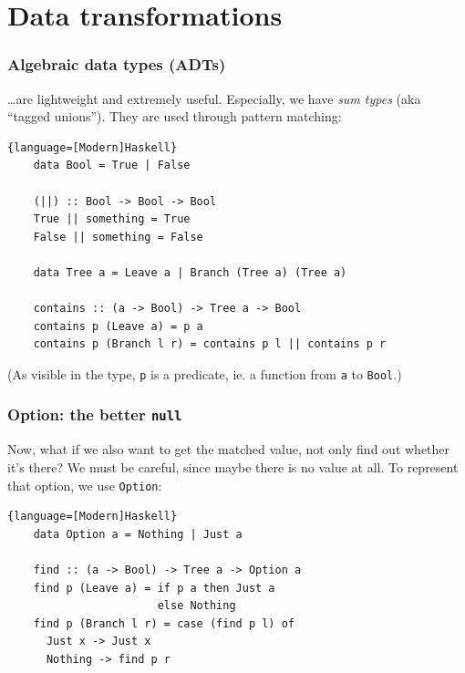 \documentclass{beamer}
\begin{document}
\section{Data transformations}

\begin{frame}[containsverbatim]
  \frametitle{Algebraic data types (ADTs)} 

  \ldots are lightweight and extremely useful. Especially, we have \textit{sum types} (aka
  \enquote{tagged unions}). They are used through pattern matching:

  \begin{lstlisting}{language=[Modern]Haskell}
    data Bool = True | False

    (||) :: Bool -> Bool -> Bool
    True || something = True
    False || something = False

    data Tree a = Leave a | Branch (Tree a) (Tree a)

    contains :: (a -> Bool) -> Tree a -> Bool
    contains p (Leave a) = p a
    contains p (Branch l r) = contains p l || contains p r 
  \end{lstlisting}

  (As visible in the type, \lstinline|p| is a predicate, ie. a function from \lstinline|a| to
  \lstinline|Bool|.)
\end{frame}

\begin{frame}[containsverbatim]
  \frametitle{Option: the better \texttt{null}} 

  Now, what if we also want to get the matched value, not only find out whether it's there? We must
  be careful, since maybe there is no value at all. To represent that option, we use
  \lstinline|Option|:

  \begin{lstlisting}{language=[Modern]Haskell}
    data Option a = Nothing | Just a

    find :: (a -> Bool) -> Tree a -> Option a
    find p (Leave a) = if p a then Just a
                       else Nothing
    find p (Branch l r) = case (find p l) of
      Just x -> Just x
      Nothing -> find p r
  \end{lstlisting}
\end{frame}
\end{document}
